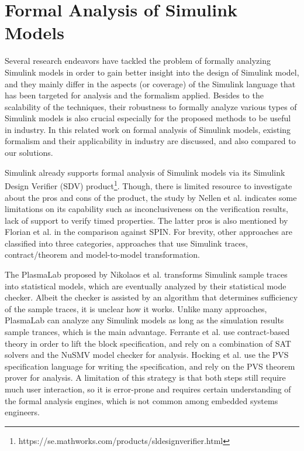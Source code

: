 \section{Formal Analysis of Simulink Models}
Several research endeavors have tackled the problem of formally analyzing Simulink models in order to gain better insight into the design of Simulink model, and they mainly differ in the aspects (or coverage) of the Simulink language that has been targeted for analysis and the formalism applied. Besides to the scalability of the techniques, their robustness to formally analyze various types of Simulink models is also crucial especially for the proposed methods to be useful in industry. In this related work on formal analysis of Simulink models, existing formalism and their applicability in industry are discussed, and also compared to our solutions.

Simulink already supports formal analysis of Simulink models via its Simulink Design Verifier (SDV) product\footnote{https://se.mathworks.com/products/sldesignverifier.html}. Though, there is limited resource to investigate about the pros and cons of the product, the study by Nellen et al. \cite{Nellen2018FormalRecommendations} indicates some limitations on its capability such as inconclusiveness on the verification results, lack of support to verify timed properties. The latter pros is also mentioned by Florian et al. \cite{Leitner2008SimulinkStudy} in the comparison against SPIN. For brevity, other approaches are classified into three categories, approaches that use Simulink traces, contract/theorem and model-to-model transformation. 

The PlasmaLab proposed by Nikolaos et al. \cite{Kekatos2018ConstructingHybridization} transforms Simulink sample traces into statistical models, which are eventually analyzed by their statistical mode checker. Albeit the checker is assisted by an algorithm that determines sufficiency of the sample traces, it is unclear how it works. Unlike many approaches, PlasmaLab can analyze any Simulink models as long as the simulation results sample trances, which is the main advantage. Ferrante et al. \cite{Hocking2016ProvingModels} use contract-based theory in order to lift the block specification, and rely on a combination of SAT solvers and the NuSMV model checker for analysis. Hocking et al. \cite{Ferrante2012ParallelSystems} use the PVS specification language for writing the specification, and rely on the PVS theorem prover for analysis. A limitation of this strategy is that both steps still require much user interaction, so it is error-prone and requires certain understanding of the formal analysis engines, which is not common among embedded systems engineers.

